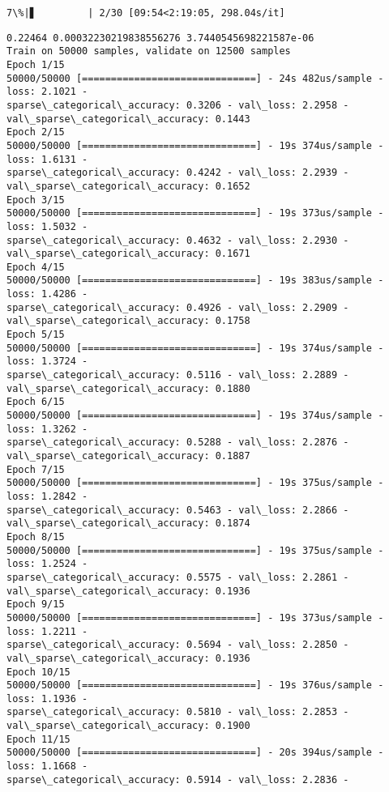 \documentclass[11pt]{article}
\begin{document}
    \begin{Verbatim}[commandchars=\\\{\}]
  7\%|▋         | 2/30 [09:54<2:19:05, 298.04s/it]
    \end{Verbatim}

    \begin{Verbatim}[commandchars=\\\{\}]
0.22464 0.00032230219838556276 3.7440545698221587e-06
Train on 50000 samples, validate on 12500 samples
Epoch 1/15
50000/50000 [==============================] - 24s 482us/sample - loss: 2.1021 -
sparse\_categorical\_accuracy: 0.3206 - val\_loss: 2.2958 -
val\_sparse\_categorical\_accuracy: 0.1443
Epoch 2/15
50000/50000 [==============================] - 19s 374us/sample - loss: 1.6131 -
sparse\_categorical\_accuracy: 0.4242 - val\_loss: 2.2939 -
val\_sparse\_categorical\_accuracy: 0.1652
Epoch 3/15
50000/50000 [==============================] - 19s 373us/sample - loss: 1.5032 -
sparse\_categorical\_accuracy: 0.4632 - val\_loss: 2.2930 -
val\_sparse\_categorical\_accuracy: 0.1671
Epoch 4/15
50000/50000 [==============================] - 19s 383us/sample - loss: 1.4286 -
sparse\_categorical\_accuracy: 0.4926 - val\_loss: 2.2909 -
val\_sparse\_categorical\_accuracy: 0.1758
Epoch 5/15
50000/50000 [==============================] - 19s 374us/sample - loss: 1.3724 -
sparse\_categorical\_accuracy: 0.5116 - val\_loss: 2.2889 -
val\_sparse\_categorical\_accuracy: 0.1880
Epoch 6/15
50000/50000 [==============================] - 19s 374us/sample - loss: 1.3262 -
sparse\_categorical\_accuracy: 0.5288 - val\_loss: 2.2876 -
val\_sparse\_categorical\_accuracy: 0.1887
Epoch 7/15
50000/50000 [==============================] - 19s 375us/sample - loss: 1.2842 -
sparse\_categorical\_accuracy: 0.5463 - val\_loss: 2.2866 -
val\_sparse\_categorical\_accuracy: 0.1874
Epoch 8/15
50000/50000 [==============================] - 19s 375us/sample - loss: 1.2524 -
sparse\_categorical\_accuracy: 0.5575 - val\_loss: 2.2861 -
val\_sparse\_categorical\_accuracy: 0.1936
Epoch 9/15
50000/50000 [==============================] - 19s 373us/sample - loss: 1.2211 -
sparse\_categorical\_accuracy: 0.5694 - val\_loss: 2.2850 -
val\_sparse\_categorical\_accuracy: 0.1936
Epoch 10/15
50000/50000 [==============================] - 19s 376us/sample - loss: 1.1936 -
sparse\_categorical\_accuracy: 0.5810 - val\_loss: 2.2853 -
val\_sparse\_categorical\_accuracy: 0.1900
Epoch 11/15
50000/50000 [==============================] - 20s 394us/sample - loss: 1.1668 -
sparse\_categorical\_accuracy: 0.5914 - val\_loss: 2.2836 -

\end{Verbatim}
\end{document}
